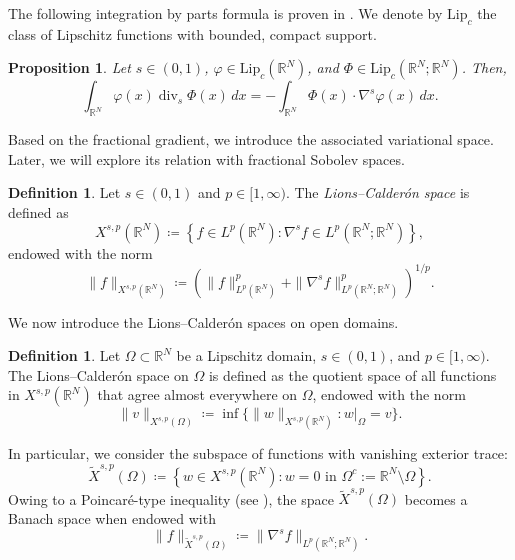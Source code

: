 \documentclass[]{amsart}
\newtheorem{proposition}[theorem]{Proposition}
\theoremstyle{definition}
\theoremstyle{definition}
\newtheorem{definition}[theorem]{Definition}
\theoremstyle{remark}
\numberwithin{equation}{section}
\begin{document}
The following integration by parts formula is proven in \cite[Section 2.4]{comi2019distributional}.
We denote by $\mbox{Lip}_{c}$ the class of Lipschitz functions with bounded, compact support.

\begin{proposition}
	\label{Dualidad Gradiente y divergencia}
	Let \(s \in (0,1)\), 
     \(\varphi \in \mbox{Lip}_{c}\left(\mathbb{R}^{N}\right)\), and \(\Phi \in \mbox{Lip}_{c}\left(\mathbb{R}^{N}; \mathbb{R}^{N}\right)\).
    Then,
	\[
	\int_{\mathbb{R}^{N}} \varphi(x) \operatorname{div}_{s} \Phi(x)\, dx = - \int_{\mathbb{R}^{N}} \Phi(x) \cdot \nabla^{s} \varphi(x)\, dx.
	\]
\end{proposition}

Based on the fractional gradient, we introduce the associated variational space. Later, we will explore its relation with fractional Sobolev spaces.

\begin{definition}
	\label{Espacios Lions-Calderón}
	Let \( s \in (0,1) \) and \( p \in [1, \infty) \). The \emph{Lions–Calderón space} is defined as
	\[
	X^{s, p}(\mathbb{R}^{N}) \coloneq \left\{ f \in L^{p}(\mathbb{R}^{N}) : \nabla^{s} f \in L^{p}(\mathbb{R}^{N}; \mathbb{R}^{N}) \right\},
	\]
	endowed with the norm
	\[
	\|f\|_{X^{s, p}(\mathbb{R}^{N})} \coloneq \left( \|f\|_{L^{p}(\mathbb{R}^{N})}^{p} + \|\nabla^{s} f\|_{L^{p}(\mathbb{R}^{N}; \mathbb{R}^{N})}^{p} \right)^{1/p}.
	\]
\end{definition}

We now introduce the Lions–Calderón spaces on open domains.

\begin{definition} \label{def:Lions-Calderon-domain}
    Let \( \Omega \subset \mathbb{R}^{N}\) be a Lipschitz domain, \(s \in (0,1)\), and \(p \in [1, \infty)\).  
    The Lions–Calderón space on \(\Omega\) is defined as the quotient space of all functions in \( X^{s,p}(\mathbb{R}^{N}) \) that agree almost everywhere on \(\Omega\), endowed with the norm
    \[
        \|v \|_{X^{s,p} (\Omega)} \coloneq \inf \bigl\{ \|w\|_{X^{s,p}(\mathbb{R}^{N})} : w|_{\Omega} = v \bigr\}.
    \]
\end{definition}

In particular,  we consider the subspace of functions with vanishing exterior trace:
\begin{equation}
	\label{Regularidad: Espacios lions calderon tilde}
	\widetilde{X}^{s, p}(\Omega) \coloneq \left\{ w \in X^{s, p}(\mathbb{R}^N) : w = 0 \text{ in } \Omega^c := \mathbb{R}^N \setminus \Omega \right\}.
\end{equation}
Owing to a Poincaré-type inequality (see \cite[Theorem 2.9]{bellido2020gammaconvergencepolyconvexfunctionalsinvolving}), the space \( \widetilde{X}^{s,p}(\Omega) \) becomes a Banach space when endowed with
\[
\|f\|_{\widetilde{X}^{s, p}(\Omega)} \coloneq \|\nabla^{s} f\|_{L^{p}(\mathbb{R}^{N}; \mathbb{R}^{N})}.
\]
\end{document}
